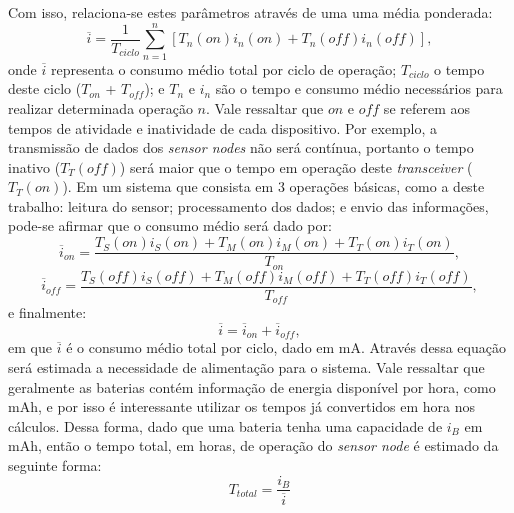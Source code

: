 \documentclass[oneside,openright,12pt]{ufsm_2015} %
\begin{document}
Com isso, relaciona-se estes parâmetros através de uma uma média ponderada:
\begin{equation}
    \overline{i} = \frac{1}{T_{ciclo}}\sum\limits_{n=1}^n [T_{n}(on)i_{n}(on) + T_{n}(off)i_{n}(off)],
\end{equation}
onde $\overline{i}$ representa o consumo médio total por ciclo de operação; $T_{ciclo}$ o tempo deste ciclo ($T_{on}$ + $T_{off}$); e $T_{n}$ e $i_{n}$ são o tempo e consumo médio necessários para realizar determinada operação $n$. Vale ressaltar que $on$ e $off$ se referem aos tempos de atividade e inatividade de cada dispositivo. Por exemplo, a transmissão de dados dos \textit{sensor nodes} não será contínua, portanto o tempo inativo ($T_{T}(off)$) será maior que o tempo em operação deste \textit{transceiver} ($T_{T}(on)$). Em um sistema que consista em 3 operações básicas, como a deste trabalho: leitura do sensor; processamento dos dados; e envio das informações, pode-se afirmar que o consumo médio será dado por:
\begin{equation}
    \overline{i}_{on} = \frac{T_{S}(on)i_{S}(on) + T_{M}(on)i_{M}(on) + T_{T}(on)i_{T}(on)}{T_{on}},
\end{equation}
\begin{equation}
    \overline{i}_{off} = \frac{T_{S}(off)i_{S}(off) + T_{M}(off)i_{M}(off) + T_{T}(off)i_{T}(off)}{T_{off}},
\end{equation}
e finalmente:
\begin{equation}
    \overline{i} = \overline{i}_{on} + \overline{i}_{off},
\end{equation}
em que $\overline{i}$ é o consumo médio total por ciclo, dado em mA. Através dessa equação será estimada a necessidade de alimentação para o sistema. Vale ressaltar que geralmente as baterias contém informação de energia disponível por hora, como mAh, e por isso é interessante utilizar os tempos já convertidos em hora nos cálculos. Dessa forma, dado que uma bateria tenha uma capacidade de $i_{B}$ em mAh, então o tempo total, em horas, de operação do \textit{sensor node} é estimado da seguinte forma:
\begin{equation}
    T_{total} = \frac{i_{B}}{\overline{i}}
\end{equation}


\end{document}
